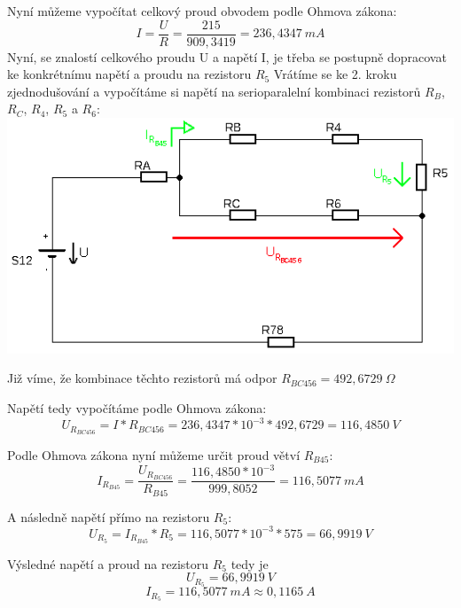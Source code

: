 Nyní můžeme vypočítat celkový proud obvodem podle Ohmova zákona:
{\large$$I = \frac{U}{R} = \frac{215}{909,3419} = 236,4347\:mA$$}
\newpage
Nyní, se znalostí celkového proudu U a napětí I, je třeba se postupně dopracovat ke konkrétnímu napětí a proudu na rezistoru $R_5$
Vrátíme se ke 2. kroku zjednodušování a vypočítáme si napětí na serioparalelní kombinaci rezistorů $R_B$, $R_C$, $R_4$, $R_5$ a $R_6$: \\

\includegraphics[totalheight=6cm]{fig/1_7.png}

Již víme, že kombinace těchto rezistorů má odpor $R_{BC456} = 492,6729\:\Omega$ 

Napětí tedy vypočítáme podle Ohmova zákona:
{\large$$U_{R_{BC456}} = I * R_{BC456} = 236,4347 * 10^{-3} * 492,6729 = 116,4850\:V$$}

Podle Ohmova zákona nyní můžeme určit proud větví $R_{B45}$:
{\large$$I_{R_{B45}} = \frac{U_{R_{BC456}}}{R_{B45}} = \frac{116,4850 * 10^{-3}}{999,8052} = 116,5077\:mA$$}

A následně napětí přímo na rezistoru $R_5$:
{\large$$U_{R_5} = I_{R_{B45}} * R_5 = 116,5077 * 10^{-3} * 575 = 66,9919\:V$$}

Výsledné napětí a proud na rezistoru $R_5$ tedy je 
{\large$$U_{R_5} = 66,9919\:V$$
$$I_{R_5} = 116,5077\:mA \approx 0,1165\:A$$}